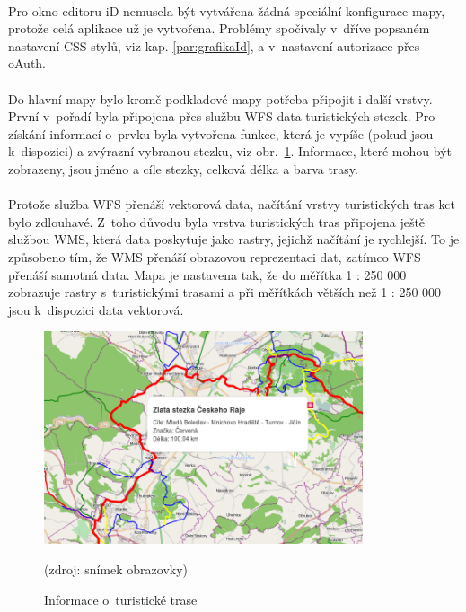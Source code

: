 \documentclass[11pt,a4paper,titlepage,oneside]{book}
\begin{document}
			\paragraph{} Pro okno editoru iD nemusela být vytvářena žádná speciální konfigurace mapy, protože celá aplikace už je vytvořena.  Problémy spočívaly v~dříve popsaném nastavení \ac{CSS} stylů, viz kap. \ref{par:grafikaId}, a v~nastavení autorizace přes oAuth.%

			\paragraph{} Do hlavní mapy bylo kromě podkladové mapy potřeba připojit i další vrstvy. První v~pořadí byla připojena přes službu \ac{WFS} data turistických stezek. Pro získání informací o~prvku byla vytvořena funkce, která je vypíše (pokud jsou k~dispozici) a zvýrazní vybranou stezku, viz obr.~\ref{fig:infoTrack}. Informace, které mohou být zobrazeny, jsou jméno a cíle stezky, celková délka a barva trasy.


			\paragraph{}Protože služba \ac{WFS} přenáší vektorová data, načítání vrstvy turistických tras \ac{kct} bylo zdlouhavé. Z~toho důvodu byla vrstva turistických tras připojena ještě službou \ac{WMS}, která data poskytuje jako rastry, jejichž načítání je rychlejší. To je způsobeno tím, že \ac{WMS} přenáší obrazovou reprezentaci dat, zatímco \ac{WFS} přenáší samotná data. Mapa je nastavena tak, že do měřítka 1 : 250 000 zobrazuje rastry s~turistickými trasami  a při měřítkách větších než 1 : 250 000 jsou k~dispozici data vektorová.
		\begin{figure}[!h]
			\begin{center}
				\includegraphics[width=9.4cm]{obrazky/toulavej/infoTrack.png}
				\caption{Informace o~turistické trase}
				\label{fig:infoTrack}
				(zdroj: snímek obrazovky)
			\end{center}
		\end{figure}	
\end{document}
